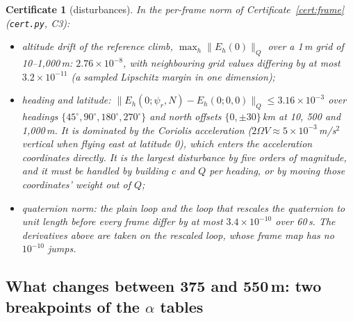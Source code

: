 \documentclass[11pt]{article}
\newtheorem{cert}{Certificate}
\begin{document}
\begin{cert}[disturbances]\label{cert:dist}
In the per-frame norm of Certificate~\ref{cert:frame} (\texttt{cert.py}, C3):
\begin{itemize}
\item \emph{altitude drift} of the reference climb, $\max_h \|E_h(0)\|_Q$ over a 1\,m grid of 10--1{,}000\,m: $2.76\times10^{-8}$, with neighbouring grid values differing by at most $3.2\times10^{-11}$ (a sampled Lipschitz margin in one dimension);
\item \emph{heading and latitude}: $\|E_h(0;\psi_r, N) - E_h(0; 0, 0)\|_Q \le 3.16\times10^{-3}$ over headings $\{45^\circ, 90^\circ, 180^\circ, 270^\circ\}$ and north offsets $\{0, \pm 30\}$\,km at 10, 500 and 1{,}000\,m. It is dominated by the Coriolis acceleration ($2\Omega V \approx 5\times10^{-3}$\,m/s$^2$ vertical when flying east at latitude 0), which enters the acceleration coordinates directly. It is the largest disturbance by five orders of magnitude, and it must be handled by building $c$ and $Q$ per heading, or by moving those coordinates' weight out of $Q$;
\item \emph{quaternion norm}: the plain loop and the loop that rescales the quaternion to unit length before every frame differ by at most $3.4\times10^{-10}$ over 60\,s. The derivatives above are taken on the rescaled loop, whose frame map has no $10^{-10}$ jumps.
\end{itemize}
\end{cert}

\subsection{What changes between 375 and 550\,m: two breakpoints of the $\alpha$ tables}\label{sec:regime}
\end{document}
